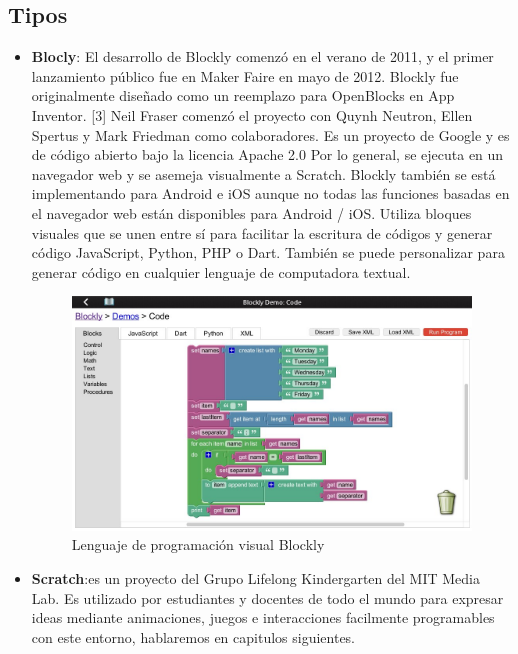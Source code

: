\subsection{Tipos}
\label{subsec:tipos}

\begin{itemize}
\item \textbf{Blocly}: El desarrollo de Blockly comenzó en el verano de 2011, y el primer lanzamiento público fue en Maker Faire en mayo de 2012. Blockly fue originalmente diseñado como un reemplazo para OpenBlocks en App Inventor. [3] Neil Fraser comenzó el proyecto con Quynh Neutron, Ellen Spertus y Mark Friedman como colaboradores.
Es un proyecto de Google y es de código abierto bajo la licencia Apache 2.0  Por lo general, se ejecuta en un navegador web y se asemeja visualmente a Scratch. Blockly también se está implementando para Android e iOS aunque no todas las funciones basadas en el navegador web están disponibles para Android / iOS.
Utiliza bloques visuales que se unen entre sí para facilitar la escritura de códigos y generar código JavaScript, Python, PHP o Dart. También se puede personalizar para generar código en cualquier lenguaje de computadora textual.

\begin{figure}[H]
    \centering
    \includegraphics[scale=0.40]{img/blockly.jpg}
  	\caption{Lenguaje de programación visual Blockly}
  	\label{fig:blockly}
\end{figure}


\item \textbf{Scratch}:es un proyecto del Grupo Lifelong Kindergarten del MIT Media Lab.
Es utilizado por estudiantes y docentes de todo el mundo para expresar ideas mediante animaciones, juegos e interacciones facilmente programables con este entorno, hablaremos en capitulos siguientes.



\end{itemize}
